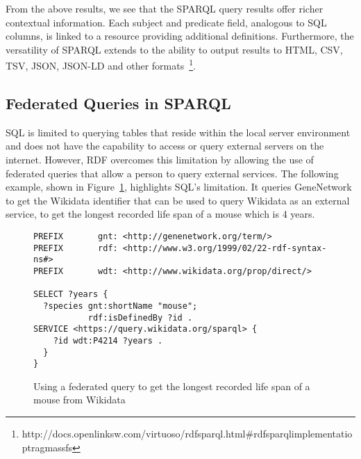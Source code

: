 From the above results, we see that the SPARQL query results offer richer contextual information.  Each subject and predicate field, analogous to SQL columns, is linked to a resource providing additional definitions.  Furthermore, the versatility of SPARQL extends to the ability to output results to HTML, CSV, TSV, JSON, JSON-LD and other formats~\footnote{http://docs.openlinksw.com/virtuoso/rdfsparql.html\#rdfsparqlimplementatioptragmassfs}.

\subsection{Federated Queries in SPARQL}

SQL is limited to querying tables that reside within the local server environment and does not have the capability to access or query external servers on the internet.  However, RDF overcomes this limitation by allowing the use of federated queries that allow a person to query external services.  The following example, shown in Figure~\ref{sparql:federated}, highlights SQL's limitation.  It queries GeneNetwork to get the Wikidata identifier that can be used to query Wikidata as an external service, to get the longest recorded life span of a mouse which is 4 years.

\begin{figure}[H]
\centering
\begin{verbatim}
PREFIX       gnt: <http://genenetwork.org/term/>
PREFIX       rdf: <http://www.w3.org/1999/02/22-rdf-syntax-ns#>
PREFIX       wdt: <http://www.wikidata.org/prop/direct/>

SELECT ?years {
  ?species gnt:shortName "mouse";
           rdf:isDefinedBy ?id .
SERVICE <https://query.wikidata.org/sparql> {
    ?id wdt:P4214 ?years .
  }
}
\end{verbatim}
\caption{Using a federated query to get the longest recorded life span of a mouse from Wikidata}\label{sparql:federated}
\end{figure}

